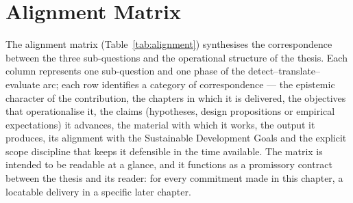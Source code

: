 \section{Alignment Matrix}
\label{sec:alignment-matrix}

The alignment matrix (Table~\ref{tab:alignment}) synthesises the correspondence between the three sub-questions and the operational structure of the thesis. Each column represents one sub-question and one phase of the detect–translate–evaluate arc; each row identifies a category of correspondence --- the epistemic character of the contribution, the chapters in which it is delivered, the objectives that operationalise it, the claims (hypotheses, design propositions or empirical expectations) it advances, the material with which it works, the output it produces, its alignment with the Sustainable Development Goals and the explicit scope discipline that keeps it defensible in the time available. The matrix is intended to be readable at a glance, and it functions as a promissory contract between the thesis and its reader: for every commitment made in this chapter, a locatable delivery in a specific later chapter.

